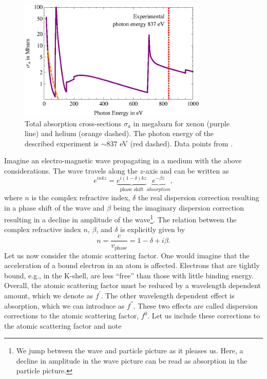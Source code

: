 \begin{figure}
	\centering
		\includegraphics[width=0.80\textwidth]{images/photoionization.eps}
	\caption[Total absorption cross-sections for helium and xenon.]{Total absorption cross-sections $\sigma_{a}$ in megabarn for xenon (purple line) and helium (orange dashed). The photon energy of the described experiment is $\sim 837$ eV (red dashed). Data points from \citep{Elettra-2016-Website,Yeh-1985-AtmDat,Yeh-1993-GBSP}.}
	\label{fig:photoionization}
\end{figure}
 Imagine an electro-magnetic wave propagating in a medium with the above considerations. The wave travels along the $z$-axis and can be written as \citep{Als-Nielson-2011-JWS,Attwood-2007-CUP}
\begin{equation}
e^{i n k z}= \underbrace{e^{i \left(1-\delta\right)k z}}_{\text{phase shift}}\underbrace{e^{-\beta z}}_{absorption},
\label{eq:wave-in-medium}
\end{equation}
where $n$ is the complex refractive index, $\delta$ the real dispersion correction resulting in a phase shift of the wave and $\beta$ being the imaginary dispersion correction resulting in a decline in amplitude of the wave\footnote{We jump between the wave and particle picture as it pleases us. Here, a decline in amplitude in the wave picture can be read as absorption in the particle picture.}. The relation between the complex refractive index $n$, $\beta$, and $\delta$ is explicitly given by
\begin{equation}
n=\frac{c}{v_{\text{phase}}}=1-\delta+i\beta.
\label{eq:complex-refractive-index}
\end{equation}
Let us now consider the atomic scattering factor. One would imagine that the acceleration of a bound electron in an atom is affected. Electrons that are tightly bound, e.g., in the K-shell, are less ``free'' than those with little binding energy. Overall, the atomic scattering factor must be reduced by a wavelength dependent amount, which we denote as $f^{'}$. The other wavelength dependent effect is absorption, which we can introduce as $f^{''}$. These two effects are called dispersion corrections to the atomic scattering factor, $f^{0}$. Let us include these corrections to the atomic scattering factor and note
